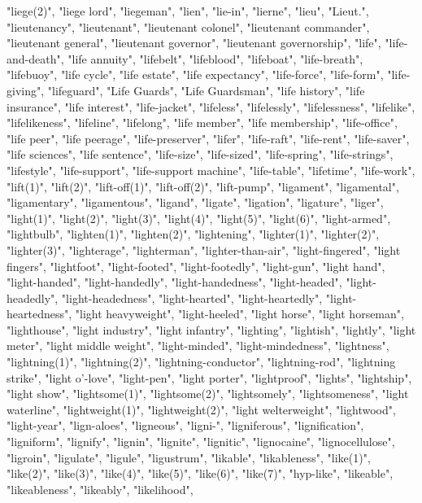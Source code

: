 "liege(2)",
"liege lord",
"liegeman",
"lien",
"lie-in",
"lierne",
"lieu",
"Lieut.",
"lieutenancy",
"lieutenant",
"lieutenant colonel",
"lieutenant commander",
"lieutenant general",
"lieutenant governor",
"lieutenant governorship",
"life",
"life-and-death",
"life annuity",
"lifebelt",
"lifeblood",
"lifeboat",
"life-breath",
"lifebuoy",
"life cycle",
"life estate",
"life expectancy",
"life-force",
"life-form",
"life-giving",
"lifeguard",
"Life Guards",
"Life Guardsman",
"life history",
"life insurance",
"life interest",
"life-jacket",
"lifeless",
"lifelessly",
"lifelessness",
"lifelike",
"lifelikeness",
"lifeline",
"lifelong",
"life member",
"life membership",
"life-office",
"life peer",
"life peerage",
"life-preserver",
"lifer",
"life-raft",
"life-rent",
"life-saver",
"life sciences",
"life sentence",
"life-size",
"life-sized",
"life-spring",
"life-strings",
"lifestyle",
"life-support",
"life-support machine",
"life-table",
"lifetime",
"life-work",
"lift(1)",
"lift(2)",
"lift-off(1)",
"lift-off(2)",
"lift-pump",
"ligament",
"ligamental",
"ligamentary",
"ligamentous",
"ligand",
"ligate",
"ligation",
"ligature",
"liger",
"light(1)",
"light(2)",
"light(3)",
"light(4)",
"light(5)",
"light(6)",
"light-armed",
"lightbulb",
"lighten(1)",
"lighten(2)",
"lightening",
"lighter(1)",
"lighter(2)",
"lighter(3)",
"lighterage",
"lighterman",
"lighter-than-air",
"light-fingered",
"light fingers",
"lightfoot",
"light-footed",
"light-footedly",
"light-gun",
"light hand",
"light-handed",
"light-handedly",
"light-handedness",
"light-headed",
"light-headedly",
"light-headedness",
"light-hearted",
"light-heartedly",
"light-heartedness",
"light heavyweight",
"light-heeled",
"light horse",
"light horseman",
"lighthouse",
"light industry",
"light infantry",
"lighting",
"lightish",
"lightly",
"light meter",
"light middle weight",
"light-minded",
"light-mindedness",
"lightness",
"lightning(1)",
"lightning(2)",
"lightning-conductor",
"lightning-rod",
"lightning strike",
"light o'-love",
"light-pen",
"light porter",
"lightproof",
"lights",
"lightship",
"light show",
"lightsome(1)",
"lightsome(2)",
"lightsomely",
"lightsomeness",
"light waterline",
"lightweight(1)",
"lightweight(2)",
"light welterweight",
"lightwood",
"light-year",
"lign-aloes",
"ligneous",
"ligni-",
"ligniferous",
"lignification",
"ligniform",
"lignify",
"lignin",
"lignite",
"lignitic",
"lignocaine",
"lignocellulose",
"ligroin",
"ligulate",
"ligule",
"ligustrum",
"likable",
"likableness",
"like(1)",
"like(2)",
"like(3)",
"like(4)",
"like(5)",
"like(6)",
"like(7)",
"hyp-like",
"likeable",
"likeableness",
"likeably",
"likelihood",
